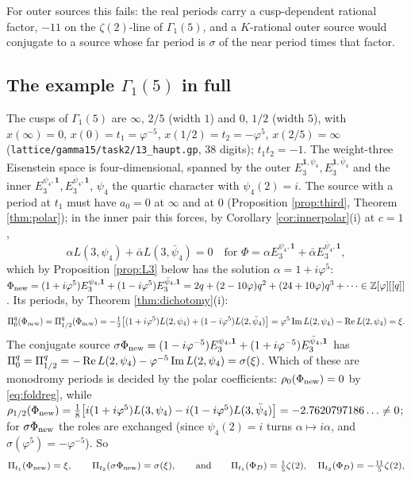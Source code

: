 \documentclass[11pt]{amsart}
\theoremstyle{definition}
\theoremstyle{remark}
\newcommand{\ct}{a_0}\renewcommand{\Re}{\operatorname{Re}}\renewcommand{\Im}{\operatorname{Im}}
\newcommand{\Phinew}{\Phi_{\rm new}}\newcommand{\Phican}{\Phi_{\rm can}}
\begin{document}
For outer sources this fails: the real periods carry a cusp-dependent rational factor, $-11$ on the $\zeta(2)$-line of $\Gamma_1(5)$, and a $K$-rational outer source would conjugate to a source whose far period is $\sigma$ of the near period times that factor.

\subsection{The example $\Gamma_1(5)$ in full}
The cusps of $\Gamma_1(5)$ are $\infty,\,2/5$ (width $1$) and $0,\,1/2$ (width $5$), with $x(\infty)=0$, $x(0)=t_1=\varphi^{-5}$, $x(1/2)=t_2=-\varphi^5$, $x(2/5)=\infty$ (\texttt{lattice/gamma15/task2/13\_haupt.gp}, $38$ digits); $t_1t_2=-1$. The weight-three Eisenstein space is four-dimensional, spanned by the outer $E_3^{\mathbf 1,\psi_4},E_3^{\mathbf 1,\bar\psi_4}$ and the inner $E_3^{\psi_4,\mathbf 1},E_3^{\bar\psi_4,\mathbf 1}$, $\psi_4$ the quartic character with $\psi_4(2)=i$. The source with a period at $t_1$ must have $\ct=0$ at $\infty$ and at $0$ (Proposition \ref{prop:third}, Theorem \ref{thm:polar}); in the inner pair this forces, by Corollary \ref{cor:innerpolar}(i) at $c=1$,
\begin{equation}\label{eq:foldreg}
\alpha L(3,\psi_4)+\bar\alpha L(3,\bar\psi_4)=0\quad\text{for }\Phi=\alpha E_3^{\psi_4,\mathbf 1}+\bar\alpha E_3^{\bar\psi_4,\mathbf 1},
\end{equation}
which by Proposition \ref{prop:L3} below has the solution $\alpha=1+i\varphi^5$: $\Phinew=(1+i\varphi^5)E_3^{\psi_4,\mathbf 1}+(1-i\varphi^5)E_3^{\bar\psi_4,\mathbf 1}=2q+(2-10\varphi)q^2+(24+10\varphi)q^3+\cdots\in\Z[\varphi][[q]]$. Its periods, by Theorem \ref{thm:dichotomy}(i):
$$\Pq_0(\Phinew)=\Pq_{1/2}(\Phinew)=-\tfrac12\bigl[(1+i\varphi^5)L(2,\psi_4)+(1-i\varphi^5)L(2,\bar\psi_4)\bigr]=\varphi^5\Im L(2,\psi_4)-\Re L(2,\psi_4)=\xi .$$
The conjugate source $\sigma\Phinew=(1-i\varphi^{-5})E_3^{\psi_4,\mathbf 1}+(1+i\varphi^{-5})E_3^{\bar\psi_4,\mathbf 1}$ has $\Pq_0=\Pq_{1/2}=-\Re L(2,\psi_4)-\varphi^{-5}\Im L(2,\psi_4)=\sigma(\xi)$. Which of these are monodromy periods is decided by the polar coefficients: $\rho_0(\Phinew)=0$ by \eqref{eq:foldreg}, while $\rho_{1/2}(\Phinew)=\tfrac18\bigl[i(1+i\varphi^5)L(3,\psi_4)-i(1-i\varphi^5)L(3,\bar\psi_4)\bigr]=-2.7620797186\ldots\ne0$; for $\sigma\Phinew$ the roles are exchanged (since $\psi_4(2)=i$ turns $\alpha\mapsto i\alpha$, and $\sigma(\varphi^5)=-\varphi^{-5}$). So
\begin{equation}\label{eq:g15}
\Pi_{t_1}(\Phinew)=\xi,\qquad \Pi_{t_2}(\sigma\Phinew)=\sigma(\xi),\qquad\text{and}\qquad \Pi_{t_1}(\Phi_D)=\tfrac15\zeta(2),\quad\Pi_{t_2}(\Phi_D)=-\tfrac{11}5\zeta(2),
\end{equation}
\end{document}
